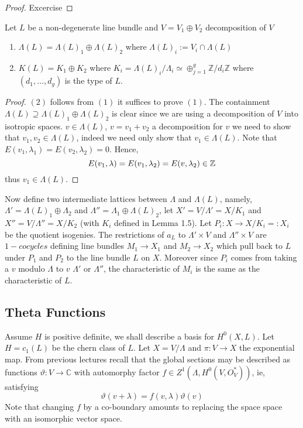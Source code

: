 \begin{paragraph}{}
\begin{proposition}
\end{proposition}
\begin{proof}
Excercise
\end{proof}
\begin{lemma}
Let $L$ be a non-degenerate line bundle and $V=V_1\oplus V_2$ decomposition of $V$
\begin{enumerate}
\item $\Lambda(L)=\Lambda(L)_1\oplus \Lambda(L)_2$ where $\Lambda(L)_i:=V_i\cap \Lambda(L)$
\item $K(L)=K_1\oplus K_2$ where $K_i=\Lambda(L)_i/\Lambda_i\simeq \oplus_{j=1}^g \mathbb{Z}/ d_i \mathbb{Z}$ where $(d_1,\dots, d_g)$ is the type of $L$.
\end{enumerate}
\end{lemma}
\begin{proof}
$(2)$ follows from $(1)$ it suffices to prove $(1)$. The containment $\Lambda(L)\supseteq \Lambda(L)_1\oplus \Lambda(L)_2$ is clear since we are using a decomposition of $V$ into isotropic spaces. $v\in \Lambda(L)$, $v=v_1+v_2$ a decomposition for $v$ we need to show that $v_1,v_2\in \Lambda(L)$, indeed we need only show that $v_1\in \Lambda(L)$. Note that $E(v_1, \lambda_1)=E(v_2, \lambda_2)=0$. Hence,
\begin{equation*}
E(v_1,\lambda)=E(v_1,\lambda_2)=E(v, \lambda_2)\in {\mathbb Z}
\end{equation*}
thus $v_1\in \Lambda(L)$.
\end{proof}
Now define two intermediate lattices between $\Lambda$ and $\Lambda(L)$, namely, $\Lambda'=\Lambda(L)_1\oplus \Lambda_2$ and $\Lambda''=\Lambda_1\oplus \Lambda(L)_2$, let $X'=V/\Lambda'= X/K_1$ and $X''=V/\Lambda''=X/K_2$ (with $K_i$ defined in Lemma 1.5). Let $P_i:X\rightarrow X/K_i=:X_i$ be the quotient isogenies. The restrictions of $a_L$ to $\Lambda'\times V$ and $\Lambda''\times V$ are $1-cocycles$ defining line bundles $M_1\rightarrow X_1$ and $M_2\rightarrow X_2$ which pull back to $L$ under $P_1$ and $P_2$ to the line bundle $L$ on $X$. Moreover since $P_i$ comes from taking a $v$ modulo $\Lambda$ to $v$ $\Lambda'$ or $\Lambda''$, the characteristic of $M_i$ is the same as the characteristic of $L$.
\end{paragraph}
\subsection{Theta Functions}
\begin{paragraph}
{}Assume $H$ is positive definite, we shall describe a basis for $H^0(X,L)$. Let $H=c_1(L)$ be the chern class of $L$. Let $X=V/\Lambda$ and $\pi:V\rightarrow X$ the exponential map. From previous lectures recall that the global sections may be described as functions $\vartheta:V\rightarrow \mathbb{C}$ with automorphy factor $f\in Z^1(\Lambda, H^0(V, O_V^*))$, ie, satisfying
\begin{equation*}
\vartheta(v+\lambda)=f(v,\lambda) \vartheta(v)
\end{equation*}
Note that changing $f$ by a co-boundary amounts to replacing the space space with an isomorphic vector space.
\end{paragraph}
